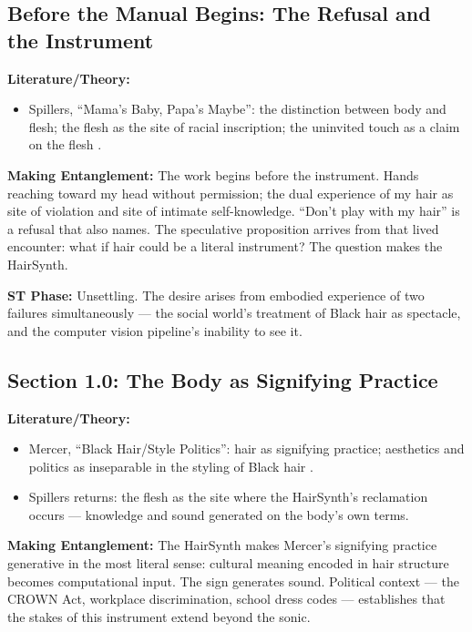 \medskip

\subsection*{Before the Manual Begins: The Refusal and the Instrument}

\noindent\textbf{Literature/Theory:}
\begin{itemize}[noitemsep]
    \item Spillers, ``Mama's Baby, Papa's Maybe'': the distinction between body and flesh; the flesh as the site of racial inscription; the uninvited touch as a claim on the flesh \parencite{Spillers_1987}.
\end{itemize}

\noindent\textbf{Making Entanglement:} The work begins before the instrument. Hands reaching toward my head without permission; the dual experience of my hair as site of violation and site of intimate self-knowledge. ``Don't play with my hair'' is a refusal that also names. The speculative proposition arrives from that lived encounter: what if hair could be a literal instrument? The question makes the HairSynth.

\noindent\textbf{ST Phase:} Unsettling. The desire arises from embodied experience of two failures simultaneously — the social world's treatment of Black hair as spectacle, and the computer vision pipeline's inability to see it.

\medskip

\subsection*{Section 1.0: The Body as Signifying Practice}

\noindent\textbf{Literature/Theory:}
\begin{itemize}[noitemsep]
    \item Mercer, ``Black Hair/Style Politics'': hair as signifying practice; aesthetics and politics as inseparable in the styling of Black hair \parencite{Mercer_1987}.
    \item Spillers returns: the flesh as the site where the HairSynth's reclamation occurs — knowledge and sound generated on the body's own terms.
\end{itemize}

\noindent\textbf{Making Entanglement:} The HairSynth makes Mercer's signifying practice generative in the most literal sense: cultural meaning encoded in hair structure becomes computational input. The sign generates sound. Political context — the CROWN Act, workplace discrimination, school dress codes — establishes that the stakes of this instrument extend beyond the sonic.

